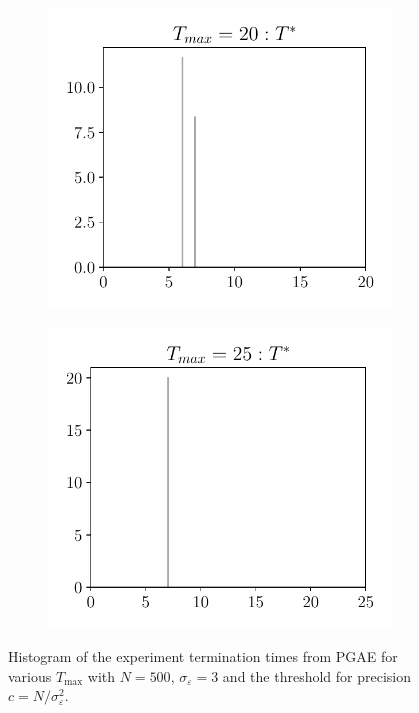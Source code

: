 \begin{figure}[h!]
\begin{subfigure}{0.25\textwidth}
	\end{subfigure}%
	\begin{subfigure}{0.25\textwidth}
		\centering
		\includegraphics[width=1\linewidth]{plots/simulation/T_20_T_ast_adaptive.pdf}
	\end{subfigure}%
	\begin{subfigure}{0.25\textwidth}
		\centering
		\includegraphics[width=1\linewidth]{plots/simulation/T_25_T_ast_adaptive.pdf}
	\end{subfigure}
	\caption{Histogram of the experiment termination times from PGAE for various $T_{\max}$ with $N = 500$, $\sigma_\varepsilon = 3$ and the threshold for precision $c = N/\sigma_\varepsilon^2 $.}
	\label{fig:experiment-termination-page}
\end{figure}


